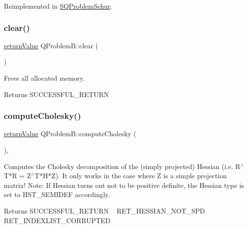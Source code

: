 Reimplemented in \hyperlink{class_s_q_problem_schur_a3ca7e562b8ea01f5fe7bcfb7582efb4c}{S\+Q\+Problem\+Schur}.

\mbox{\label{class_q_problem_b_a957104bb5ebd44cd9d37878c2b6e8a52}} 
\subsubsection{\texorpdfstring{clear()}{clear()}}
{\footnotesize\ttfamily \hyperlink{_message_handling_8hpp_a81d556f613bfbabd0b1f9488c0fa865e}{return\+Value} Q\+Problem\+B\+::clear (\begin{DoxyParamCaption}{ }\end{DoxyParamCaption})\hspace{0.3cm}{\ttfamily [protected]}}

Frees all allocated memory. \begin{DoxyReturn}{Returns}
S\+U\+C\+C\+E\+S\+S\+F\+U\+L\+\_\+\+R\+E\+T\+U\+RN 
\end{DoxyReturn}
\mbox{\label{class_q_problem_b_a5f9fa59b80f990a897ba783e89dd03d3}} 
\subsubsection{\texorpdfstring{compute\+Cholesky()}{computeCholesky()}}
{\footnotesize\ttfamily \hyperlink{_message_handling_8hpp_a81d556f613bfbabd0b1f9488c0fa865e}{return\+Value} Q\+Problem\+B\+::compute\+Cholesky (\begin{DoxyParamCaption}{ }\end{DoxyParamCaption})\hspace{0.3cm}{\ttfamily [protected]}, {\ttfamily [virtual]}}

Computes the Cholesky decomposition of the (simply projected) Hessian (i.\+e. R$^\wedge$\+T$\ast$R = Z$^\wedge$\+T$\ast$\+H$\ast$Z). It only works in the case where Z is a simple projection matrix! Note\+: If Hessian turns out not to be positive definite, the Hessian type is set to H\+S\+T\+\_\+\+S\+E\+M\+I\+D\+EF accordingly. \begin{DoxyReturn}{Returns}
S\+U\+C\+C\+E\+S\+S\+F\+U\+L\+\_\+\+R\+E\+T\+U\+RN ~\newline
 R\+E\+T\+\_\+\+H\+E\+S\+S\+I\+A\+N\+\_\+\+N\+O\+T\+\_\+\+S\+PD ~\newline
 R\+E\+T\+\_\+\+I\+N\+D\+E\+X\+L\+I\+S\+T\+\_\+\+C\+O\+R\+R\+U\+P\+T\+ED 
\end{DoxyReturn}
\mbox{\label{class_q_problem_b_a86fe81c39dfa3b2d2048ba4108f4c110}} 
